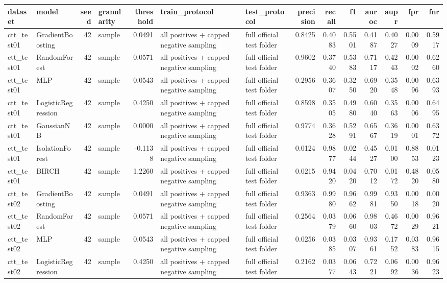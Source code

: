 \begin{tabular}{llrlrllrrrrrrr}
\toprule
dataset & model & seed & granularity & threshold & train\_protocol & test\_protocol & precision & recall & f1 & auroc & aupr & fpr & fnr \\
\midrule
ctt\_test01 & GradientBoosting & 42 & sample & 0.0491 & all positives + capped negative sampling & full official test folder & 0.8425 & 0.4083 & 0.5501 & 0.4187 & 0.4027 & 0.0009 & 0.5917 \\
ctt\_test01 & RandomForest & 42 & sample & 0.0571 & all positives + capped negative sampling & full official test folder & 0.9602 & 0.3740 & 0.5383 & 0.7117 & 0.4243 & 0.0002 & 0.6260 \\
ctt\_test01 & MLP & 42 & sample & 0.0543 & all positives + capped negative sampling & full official test folder & 0.2956 & 0.3607 & 0.3250 & 0.6920 & 0.3548 & 0.0096 & 0.6393 \\
ctt\_test01 & LogisticRegression & 42 & sample & 0.4250 & all positives + capped negative sampling & full official test folder & 0.8598 & 0.3505 & 0.4980 & 0.6040 & 0.3563 & 0.0006 & 0.6495 \\
ctt\_test01 & GaussianNB & 42 & sample & 0.0000 & all positives + capped negative sampling & full official test folder & 0.9774 & 0.3628 & 0.5291 & 0.6567 & 0.3619 & 0.0001 & 0.6372 \\
ctt\_test01 & IsolationForest & 42 & sample & -0.1138 & all positives + capped negative sampling & full official test folder & 0.0124 & 0.9877 & 0.0244 & 0.4527 & 0.0100 & 0.8853 & 0.0123 \\
ctt\_test01 & BIRCH & 42 & sample & 1.2260 & all positives + capped negative sampling & full official test folder & 0.0215 & 0.9420 & 0.0420 & 0.7012 & 0.0172 & 0.4820 & 0.0580 \\
ctt\_test02 & GradientBoosting & 42 & sample & 0.0491 & all positives + capped negative sampling & full official test folder & 0.9363 & 0.9980 & 0.9662 & 0.9981 & 0.9350 & 0.0018 & 0.0020 \\
ctt\_test02 & RandomForest & 42 & sample & 0.0571 & all positives + capped negative sampling & full official test folder & 0.2564 & 0.0379 & 0.0660 & 0.9803 & 0.4672 & 0.0029 & 0.9621 \\
ctt\_test02 & MLP & 42 & sample & 0.0543 & all positives + capped negative sampling & full official test folder & 0.0256 & 0.0385 & 0.0307 & 0.9361 & 0.1752 & 0.0383 & 0.9615 \\
ctt\_test02 & LogisticRegression & 42 & sample & 0.4250 & all positives + capped negative sampling & full official test folder & 0.2162 & 0.0377 & 0.0643 & 0.7221 & 0.0692 & 0.0036 & 0.9623 \\

\end{tabular}
